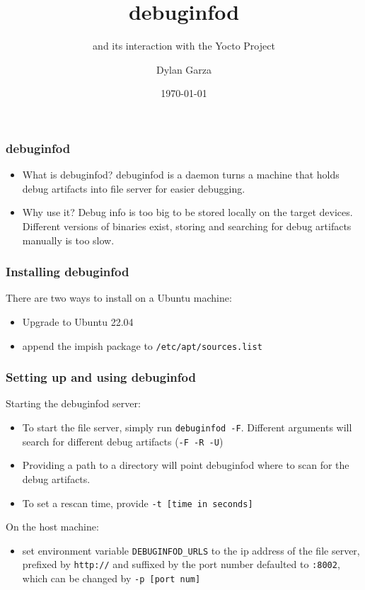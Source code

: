 \documentclass[8pt]{beamer}
\title{debuginfod}
\subtitle{and its interaction with the 
Yocto Project}
\author{Dylan Garza}
\date{\today}
\begin{document}
\frame{\titlepage}

\begin{frame}
   \frametitle{debuginfod}
   \vspace{-1cm}
   \begin{itemize}
      \item What is debuginfod?
      debuginfod is a daemon turns a machine that
      holds debug artifacts into file server for
      easier debugging. \\
      \vspace{.5cm}
      \item Why use it?
      Debug info is too big to be stored locally
      on the target devices. Different versions 
      of binaries exist, storing and searching 
      for debug artifacts manually is too slow.
   \end{itemize}
\end{frame}

\begin{frame}[fragile]
   \frametitle{Installing debuginfod}
   \vspace{-1cm}
   \noindent
   There are two ways to install on a Ubuntu machine:
   \begin{itemize}
      \item Upgrade to Ubuntu 22.04
      \item append the impish package to \verb|/etc/apt/sources.list|
   \end{itemize}
\end{frame}

\begin{frame}[fragile]
   \frametitle{Setting up and using debuginfod}
   Starting the debuginfod server:
   \begin{itemize}
      \item To start the file server, simply run \verb|debuginfod -F|. 
         Different arguments will search for different debug artifacts (\verb|-F -R -U|)
      \item Providing a path to a directory will point debuginfod where to scan for the debug artifacts.
      \item To set a rescan time, provide \verb|-t [time in seconds]|
   \end{itemize}
   On the host machine:
   \begin{itemize}
      \item set environment variable \verb|DEBUGINFOD_URLS| to the ip address 
         of the file server, prefixed by \verb|http://| and suffixed by the 
         port number defaulted to \verb|:8002|, which can be changed by \verb|-p [port num]|
   \end{itemize}
\end{frame}
\end{document}
